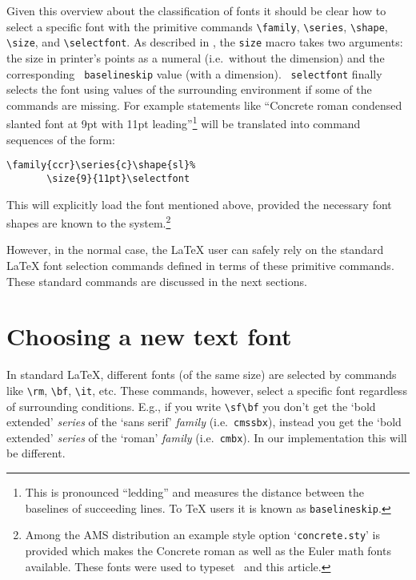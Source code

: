  Given this overview about the classification of fonts it should be
 clear how to select a specific font with the primitive commands
 \verb+\family+, \verb+\series+, \verb+\shape+, \verb+\size+, and
 \verb+\selectfont+.  As described in \cite{basic}, the
 {\tt\bslash size} macro takes two arguments: the size
 in printer's points as a numeral (i.e.~without the
 dimension) and the corresponding {\tt\bslash
 baselineskip} value (with a dimension).  {\tt\bslash
 selectfont} finally selects the font using values of
 the surrounding environment if some of the commands
 are missing.
 For example statements like ``Concrete roman condensed
 slanted font at 9pt with 11pt leading''\footnote{This
 is pronounced ``ledding'' and measures the distance
 between the baselines of succeeding lines. To \TeX{}
 users it is known as {\tt\bslash baselineskip}.} will
 be translated into   command sequences of the form:
\begin{verbatim}
\family{ccr}\series{c}\shape{sl}%
       \size{9}{11pt}\selectfont
\end{verbatim}
 This will explicitly load the font mentioned above,
 provided the necessary font shapes are known to the
 system.\footnote{Among the AMS distribution an example
 style option `{\tt concrete.sty}' is provided which
 makes the Concrete roman as well as the Euler math
 fonts available. These fonts were used to
 typeset~\cite{ConcreteMath}
 and this article.}
 
 
 However, in the normal case, the \LaTeX{} user can safely rely on the
 standard \LaTeX{} font selection commands defined in terms
 of these primitive commands. These standard commands are discussed
 in the next sections.
 
 
 \section{Choosing a new text font}
 
 In standard \LaTeX{}, different fonts (of the same size) are selected
 by commands like \verb+\rm+, \verb+\bf+, \verb+\it+, etc.  These
 commands, however, select a specific font regardless of surrounding
 conditions.  E.g., if you write \verb+\sf\bf+ you don't get the `bold
 extended' {\em series\/} of the `sans serif' {\em family\/} (i.e.\
 {\tt cmssbx}), instead you get the `bold extended' {\em series\/} of
 the `roman' {\em family\/} (i.e.\ {\tt cmbx}).  In our
 implementation this will be different.
 

